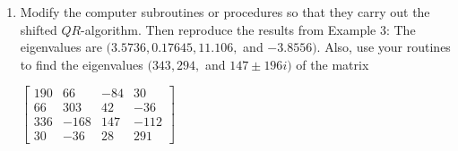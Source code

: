 \documentclass[12pt]{article}
\theoremstyle{definition}
\begin{document}
\begin{enumerate}
\item Modify the computer subroutines or procedures so that they carry out the shifted $QR$-algorithm. Then reproduce the results from Example 3: The eigenvalues are $(3.5736, 0.17645, 11.106,$ and $-3.8556)$. Also, use your routines to find the eigenvalues $(343, 294,$ and $147\pm196i)$ of the matrix \begin{center}$\begin{bmatrix}190&66&-84&30\\66&303&42&-36\\336&-168&147&-112\\30&-36&28&291\end{bmatrix}$\end{center}

\end{enumerate}
\end{document}
